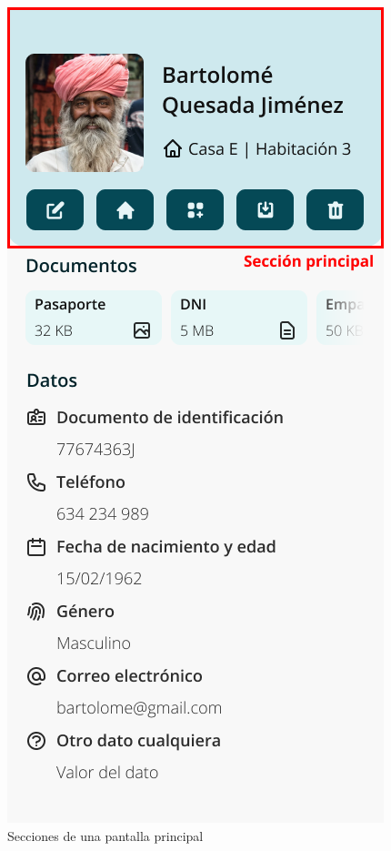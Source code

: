 \begin{figure}[h!]
        \caption{Secciones de una pantalla principal}
        \label{fig:secciones-principal}
    \endminipage\hfill
        \centering
        \includegraphics[width=\linewidth]{diseno/app/presentacion/secciones-elemento.png}

\end{figure}
